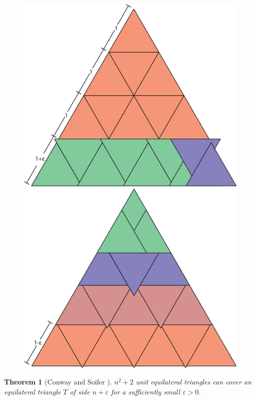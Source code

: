 \documentclass[a4paper]{amsart}
\theoremstyle{plain}
\newtheorem{theorem}{Theorem}
\theoremstyle{definition}
\begin{document}
\begin{figure}[h]
   \begin{minipage}{0.5\textwidth}
     \centering
     \includegraphics[width=0.9\linewidth]{triangle1.png}
     \caption{}
     \label{fig:triangle1}
   \end{minipage}\hfill
   \begin{minipage}{0.5\textwidth}
     \centering
     \includegraphics[width=0.9\linewidth]{triangle2.png}
     \caption{}
     \label{fig:triangle2}
   \end{minipage}
\end{figure}

\begin{theorem}[Conway and Soifer \cite{conway2004coverup, conway2005covering}]
\label{thm:main-prev}
$n^2 + 2$ unit equilateral triangles can cover an equilateral triangle $T$ of side $n + \varepsilon$ for a sufficiently small $\varepsilon > 0$.
\end{theorem}
\end{document}
